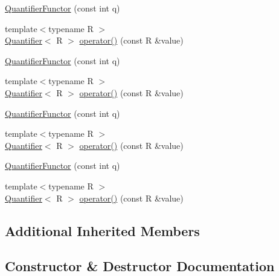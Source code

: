 \begin{DoxyCompactItemize}
\item 
\mbox{\hyperlink{structfakeit_1_1QuantifierFunctor_ab88926a4a47ce8c12661adb1db90a238}{Quantifier\+Functor}} (const int q)
\item 
{\footnotesize template$<$typename R $>$ }\\\mbox{\hyperlink{structfakeit_1_1Quantifier}{Quantifier}}$<$ R $>$ \mbox{\hyperlink{structfakeit_1_1QuantifierFunctor_ae21e5262079b54f71eda7d3847967f06}{operator()}} (const R \&value)
\item 
\mbox{\hyperlink{structfakeit_1_1QuantifierFunctor_ab88926a4a47ce8c12661adb1db90a238}{Quantifier\+Functor}} (const int q)
\item 
{\footnotesize template$<$typename R $>$ }\\\mbox{\hyperlink{structfakeit_1_1Quantifier}{Quantifier}}$<$ R $>$ \mbox{\hyperlink{structfakeit_1_1QuantifierFunctor_ae21e5262079b54f71eda7d3847967f06}{operator()}} (const R \&value)
\item 
\mbox{\hyperlink{structfakeit_1_1QuantifierFunctor_ab88926a4a47ce8c12661adb1db90a238}{Quantifier\+Functor}} (const int q)
\item 
{\footnotesize template$<$typename R $>$ }\\\mbox{\hyperlink{structfakeit_1_1Quantifier}{Quantifier}}$<$ R $>$ \mbox{\hyperlink{structfakeit_1_1QuantifierFunctor_ae21e5262079b54f71eda7d3847967f06}{operator()}} (const R \&value)
\item 
\mbox{\hyperlink{structfakeit_1_1QuantifierFunctor_ab88926a4a47ce8c12661adb1db90a238}{Quantifier\+Functor}} (const int q)
\item 
{\footnotesize template$<$typename R $>$ }\\\mbox{\hyperlink{structfakeit_1_1Quantifier}{Quantifier}}$<$ R $>$ \mbox{\hyperlink{structfakeit_1_1QuantifierFunctor_ae21e5262079b54f71eda7d3847967f06}{operator()}} (const R \&value)
\end{DoxyCompactItemize}
\subsection*{Additional Inherited Members}


\subsection{Constructor \& Destructor Documentation}
\mbox{\label{structfakeit_1_1QuantifierFunctor_ab88926a4a47ce8c12661adb1db90a238}} 
